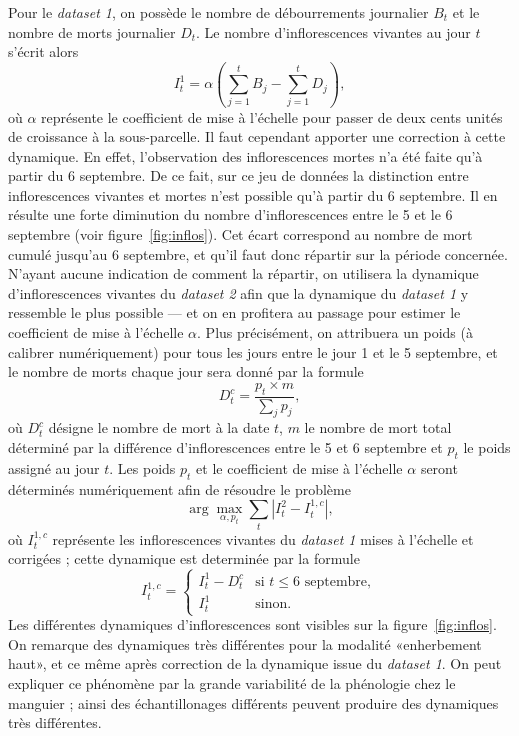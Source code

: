 Pour le \emph{dataset 1}, on possède le nombre de débourrements journalier $B_t$ et le nombre de morts journalier $D_t$.
Le nombre d'inflorescences vivantes au jour $t$ s'écrit alors
\[
I_t^1 = \alpha\left( \sum_{j=1}^{t} B_j - \sum_{j=1}^{t} D_j \right),
\]
où $\alpha$ représente le coefficient de mise à l'échelle pour passer de deux cents unités de croissance à la sous-parcelle.
Il faut cependant apporter une correction à cette dynamique.
En effet, l'observation des inflorescences mortes n'a été faite qu'à partir du 6 septembre.
De ce fait, sur ce jeu de données la distinction entre inflorescences vivantes et mortes n'est possible qu'à partir du 6 septembre.
Il en résulte une forte diminution du nombre d'inflorescences entre le 5 et le 6 septembre (voir figure~\ref{fig:inflos}).
Cet écart correspond au nombre de mort cumulé jusqu'au 6 septembre, et qu'il faut donc répartir sur la période concernée.
N'ayant aucune indication de comment la répartir, on utilisera la dynamique d'inflorescences vivantes du \emph{dataset 2} afin que la dynamique du \emph{dataset 1} y ressemble le plus possible --- et on en profitera au passage pour estimer le coefficient de mise à l'échelle $\alpha$.
Plus précisément, on attribuera un poids (à calibrer numériquement) pour tous les jours entre le jour 1 et le 5 septembre, et le nombre de morts chaque jour sera donné par la formule
\[
D_{t}^{c} = \frac{p_t\times m}{\sum_{j}p_j},
\]
où $D_{t}^{c}$ désigne le nombre de mort à la date $t$, $m$ le nombre de mort total déterminé par la différence d'inflorescences entre le 5 et 6 septembre et $p_t$ le poids assigné au jour $t$. 
Les poids $p_t$ et le coefficient de mise à l'échelle $\alpha$ seront déterminés numériquement afin de résoudre le problème
\[
\arg\max_{\alpha, p_t} \sum_{t}\left|I^{2}_{t} - I_{t}^{1, c}\right|, 
\]
où $I_{t}^{1, c}$ représente les inflorescences vivantes du \emph{dataset 1} mises à l'échelle et corrigées ; cette dynamique est determinée par la formule
\[
I_{t}^{1, c} = \begin{cases}
                I_t^1 - D_t^{c} & \text{si } t \leq 6 \text{ septembre},\\
                I_t^1 & \text{sinon}.
               \end{cases}
\]
Les différentes dynamiques d'inflorescences sont visibles sur la figure~\ref{fig:inflos}.
On remarque des dynamiques très différentes pour la modalité «enherbement haut», et ce même après correction de la dynamique issue du \emph{dataset 1}.
On peut expliquer ce phénomène par la grande variabilité de la phénologie chez le manguier ; ainsi des échantillonages différents peuvent produire des dynamiques très différentes.
